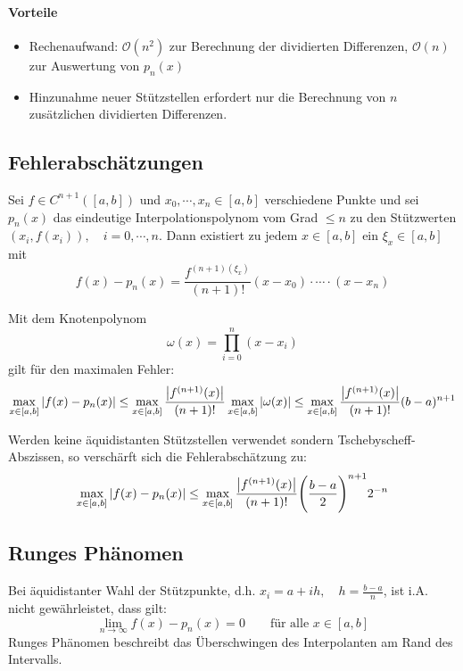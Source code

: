 			\paragraph{Vorteile}
				\begin{itemize}
					\item Rechenaufwand: \( \mathcal{O}(n^2) \) zur Berechnung der dividierten Differenzen, \( \mathcal{O}(n) \) zur Auswertung von \( p_n(x) \)
					\item Hinzunahme neuer Stützstellen erfordert nur die Berechnung von \(n\) zusätzlichen dividierten Differenzen.
				\end{itemize}

		\subsection{Fehlerabschätzungen}
			Sei \( f \in C^{n+1}([a, b]) \) und \( x_0, \cdots, x_n \in [a, b] \) verschiedene Punkte und sei \( p_n(x) \) das eindeutige Interpolationspolynom vom Grad \( \leq n \) zu den Stützwerten \( (x_i, f(x_i)), \quad i = 0, \cdots, n \). Dann existiert zu jedem \( x \in [a, b] \) ein \( \xi_x \in [a, b] \) mit
			\begin{equation*}
				f(x) - p_n(x) = \frac{f^{(n + 1)(\xi_x)}}{(n + 1)!} (x - x_0) \cdot \cdots \cdot (x - x_n)
			\end{equation*}

			Mit dem Knotenpolynom \[ \omega(x) = \prod_{i = 0}^n (x - x_i) \] gilt für den maximalen Fehler:
			\begin{equation*}
				\max_{x \in [a, b]} \abs{f(x) - p_n(x)} \leq \max_{x \in [a, b]} \frac{\abs{f^{(n + 1)}(x)}}{(n + 1)!} \max_{x \in [a, b]} \abs{\omega(x)} \leq \max_{x \in [a, b]} \frac{\abs{f^{(n + 1)}(x)}}{(n + 1)!} (b - a)^{n+1}
			\end{equation*}

			Werden keine äquidistanten Stützstellen verwendet sondern Tschebyscheff-Abszissen, so verschärft sich die Fehlerabschätzung zu:
			\begin{equation*}
				\max_{ x \in [a,b] } \abs{f(x) - p_n(x)} \leq \max_{x \in [a, b]} \frac{\abs{f^{(n+1)}(x)}}{(n + 1)!} \Bigg(\frac{b-a}{2}\Bigg)^{n+1} 2^{-n}
			\end{equation*}

		\subsection{Runges Phänomen}
			Bei äquidistanter Wahl der Stützpunkte, d.h. \( x_i = a + ih, \quad h = \frac{b - a}{n} \), ist i.A. nicht gewährleistet, dass gilt:
			\begin{equation*}
				\lim\limits_{n \rightarrow \infty} f(x) - p_n(x) = 0 \qquad \textrm{für alle } x \in [a, b]
			\end{equation*}
			Runges Phänomen beschreibt das Überschwingen des Interpolanten am Rand des Intervalls.


